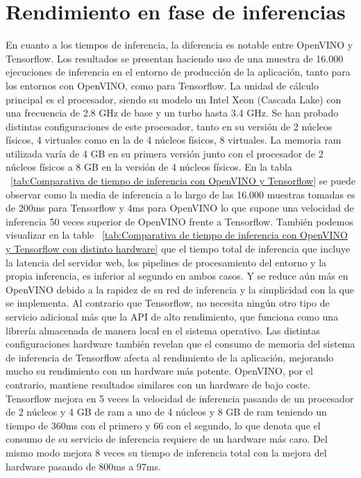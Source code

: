 \section{Rendimiento en fase de inferencias}\label{sec:ren-dimiento-en-fase-de-inferencias}
En cuanto a los tiempos de inferencia, la diferencia es notable entre OpenVINO y Tensorflow.
Los resultados se presentan haciendo uso de una muestra de 16.000 ejecuciones de inferencia en el entorno de producción de la aplicación, tanto para los entornos con OpenVINO, como para Tensorflow.
La unidad de cálculo principal es el procesador, siendo su modelo un Intel Xeon (Cascada Lake) con una frecuencia de 2.8 GHz de base y un turbo hasta 3.4 GHz.
Se han probado distintas configuraciones de este procesador, tanto en su versión de 2 núcleos físicos, 4 virtuales como en la de 4 núcleos físicos, 8 virtuales.
La memoria ram utilizada varía de 4 GB en su primera versión junto con el procesador de 2 núcleos físicos a 8 GB en la versión de 4 núcleos físicos.
En la tabla ~\ref{tab:Comparativa de tiempo de inferencia con OpenVINO y Tensorflow} se puede observar como la media de inferencia a lo largo de las 16.000 muestras tomadas
es de 200ms para Tensorflow y 4ms para OpenVINO lo que supone una velocidad de inferencia 50 veces superior de OpenVINO frente a Tensorflow.
También podemos visualizar en la table ~\ref{tab:Comparativa de tiempo de inferencia con OpenVINO y Tensorflow con distinto hardware} que el tiempo total de inferencia que incluye la latencia del servidor web, los pipelines de procesamiento del entorno y la propia inferencia, es inferior al segundo en ambos casos.
Y se reduce aún más en OpenVINO debido a la rapidez de su red de inferencia y la simplicidad con la que se implementa.
Al contrario que Tensorflow, no necesita ningún otro tipo de servicio adicional más que la API de alto rendimiento, que funciona como una librería almacenada de manera local en el sistema operativo.
Las distintas configuraciones hardware también revelan que el consumo de memoria del sistema de inferencia de Tensorflow afecta al rendimiento de la aplicación, mejorando mucho su rendimiento con un hardware más potente.
OpenVINO, por el contrario, mantiene resultados similares con un hardware de bajo coste.
Tensorflow mejora en 5 veces la velocidad de inferencia pasando de un procesador de 2 núcleos y 4 GB de ram a uno de 4 núcleos y 8 GB de ram teniendo un tiempo de 360ms con el primero y 66 con el segundo, lo que denota que el consumo de su servicio de inferencia requiere de un hardware más caro.
Del mismo modo mejora 8 veces su tiempo de inferencia total con la mejora del hardware pasando de 800ms a 97ms.


